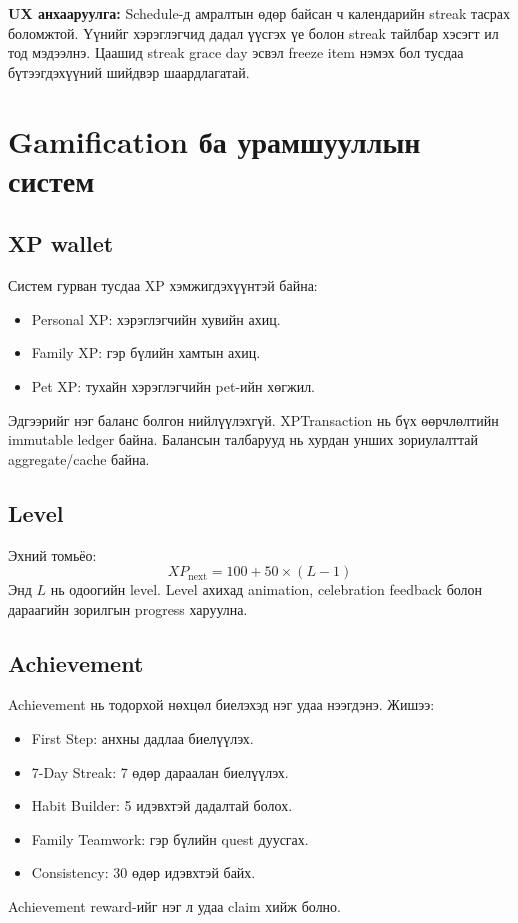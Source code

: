 \documentclass[12pt,a4paper,oneside]{report}
\begin{document}
\textbf{UX анхааруулга:} Schedule-д амралтын өдөр байсан ч календарийн streak тасрах боломжтой. Үүнийг хэрэглэгчид дадал үүсгэх үе болон streak тайлбар хэсэгт ил тод мэдээлнэ. Цаашид streak grace day эсвэл freeze item нэмэх бол тусдаа бүтээгдэхүүний шийдвэр шаардлагатай.

\chapter{Gamification ба урамшууллын систем}

\section{XP wallet}
Систем гурван тусдаа XP хэмжигдэхүүнтэй байна:
\begin{itemize}
  \item Personal XP: хэрэглэгчийн хувийн ахиц.
  \item Family XP: гэр бүлийн хамтын ахиц.
  \item Pet XP: тухайн хэрэглэгчийн pet-ийн хөгжил.
\end{itemize}
Эдгээрийг нэг баланс болгон нийлүүлэхгүй. XPTransaction нь бүх өөрчлөлтийн immutable ledger байна. Балансын талбарууд нь хурдан унших зориулалттай aggregate/cache байна.

\section{Level}
Эхний томьёо:
\[
XP_{\text{next}} = 100 + 50 \times (L-1)
\]
Энд \(L\) нь одоогийн level. Level ахихад animation, celebration feedback болон дараагийн зорилгын progress харуулна.

\section{Achievement}
Achievement нь тодорхой нөхцөл биелэхэд нэг удаа нээгдэнэ. Жишээ:
\begin{itemize}
  \item First Step: анхны дадлаа биелүүлэх.
  \item 7-Day Streak: 7 өдөр дараалан биелүүлэх.
  \item Habit Builder: 5 идэвхтэй дадалтай болох.
  \item Family Teamwork: гэр бүлийн quest дуусгах.
  \item Consistency: 30 өдөр идэвхтэй байх.
\end{itemize}
Achievement reward-ийг нэг л удаа claim хийж болно.
\end{document}
